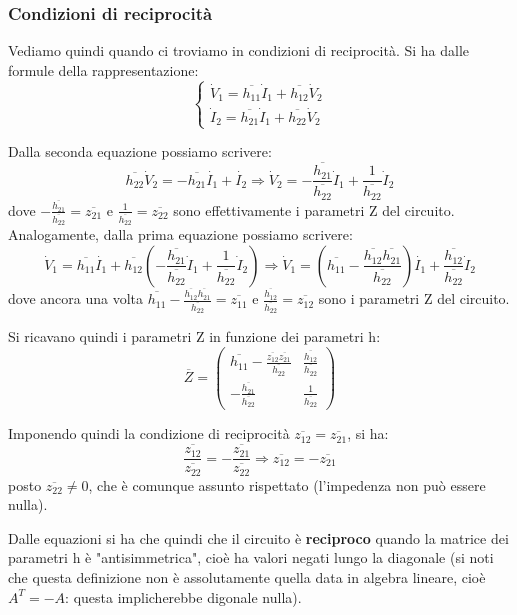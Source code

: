 \documentclass[a4paper,11pt]{article}
\begin{document}
\subsubsection{Condizioni di reciprocità}
Vediamo quindi quando ci troviamo in condizioni di reciprocità.
Si ha dalle formule della rappresentazione:
\[
	\begin{cases}
		\dot{V}_1 = \overline{h_{11}} \dot{I}_1 + \overline{h_{12}} \dot{V}_2 \\ 
		\dot{I}_2 = \overline{h_{21}} \dot{I}_1 + \overline{h_{22}} \dot{V}_2
	\end{cases}
\]

Dalla seconda equazione possiamo scrivere:
$$
\overline{h_{22}} \dot{V}_2 = - \overline{h_{21}} \dot{I_1} + \dot{I_2} \Rightarrow \dot{V}_2 = -\frac{\overline{h_{21}}}{\overline{h_{22}}} \dot{I}_1 + \frac{1}{\overline{h_{22}}} \dot{I}_2 
$$
dove $-\frac{\overline{h_{21}}}{\overline{h_{22}}} = \overline{z_{21}}$ e $\frac{1}{\overline{h_{22}}} = \overline{z_{22}}$ sono effettivamente i parametri Z del circuito.
Analogamente, dalla prima equazione possiamo scrivere:
$$
\dot{V}_1 = \overline{h_{11}} \dot{I_1} + \overline{h_{12}} \left(  -\frac{\overline{h_{21}}}{\overline{h_{22}}} \dot{I}_1 + \frac{1}{\overline{h_{22}}} \dot{I}_2  \right) \Rightarrow \dot{V}_1 = \left( \overline{h_{11}} - \frac{\overline{h_{12}}\overline{h_{21}}}{\overline{h_{22}}} \right) \dot{I_1} + \frac{\overline{h_{12}}}{\overline{h_{22}}} \dot{I}_2 
$$
dove ancora una volta $\overline{h_{11}} - \frac{\overline{h_{12}}\overline{h_{21}}}{\overline{h_{22}}} = \overline{z_{11}}$ e $\frac{\overline{h_{12}}}{\overline{h_{22}}} = \overline{z_{12}}$ sono i parametri Z del circuito. 

Si ricavano quindi i parametri Z in funzione dei parametri h:
$$
\overline{Z} =
\begin{pmatrix}
	\overline{h_{11}} - \frac{\overline{z_{12}}\overline{z_{21}}}{\overline{h_{22}}} & \frac{\overline{h_{12}}}{\overline{h_{22}}} \\ 
	- \frac{\overline{h_{21}}}{\overline{h_{22}}} & \frac{1}{\overline{h_{22}}}
\end{pmatrix}
$$

Imponendo quindi la condizione di reciprocità $\overline{z_{12}} = \overline{z_{21}}$, si ha:
$$
\frac{\overline{z_{12}}}{\overline{z_{22}}} = -\frac{\overline{z_{21}}}{\overline{z_{22}}} \Rightarrow \overline{z_{12}} = - \overline{z_{21}}
$$
posto $\overline{z_{22}} \neq 0$, che è comunque assunto rispettato (l'impedenza non può essere nulla).

Dalle equazioni si ha che quindi che il circuito è \textbf{reciproco} quando la matrice dei parametri h è "antisimmetrica", cioè ha valori negati lungo la diagonale (si noti che questa definizione non è assolutamente quella data in algebra lineare, cioè $A^T= -A$: questa implicherebbe digonale nulla). 
\end{document}
